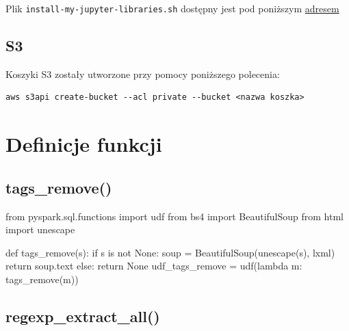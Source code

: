\documentclass[
  letterpaper,
  DIV=11,
  numbers=noendperiod]{scrreprt}
\newenvironment{Shaded}{\begin{snugshade}}{\end{snugshade}}
\newcommand{\ControlFlowTok}[1]{\textcolor[rgb]{0.00,0.23,0.31}{#1}}
\newcommand{\ImportTok}[1]{\textcolor[rgb]{0.00,0.46,0.62}{#1}}
\newcommand{\KeywordTok}[1]{\textcolor[rgb]{0.00,0.23,0.31}{#1}}
\newcommand{\NormalTok}[1]{\textcolor[rgb]{0.00,0.23,0.31}{#1}}
\newcommand{\OperatorTok}[1]{\textcolor[rgb]{0.37,0.37,0.37}{#1}}
\newcommand{\StringTok}[1]{\textcolor[rgb]{0.13,0.47,0.30}{#1}}
\newcommand{\VariableTok}[1]{\textcolor[rgb]{0.07,0.07,0.07}{#1}}
\begin{document}
\normalsize

Plik \texttt{install-my-jupyter-libraries.sh} dostępny jest pod
poniższym \href{}{adresem}

\hypertarget{s3}{%
\subsection{S3}\label{s3}}

Koszyki S3 zostały utworzone przy pomocy poniższego polecenia:

\begin{verbatim}
aws s3api create-bucket --acl private --bucket <nazwa koszka>
\end{verbatim}

\hypertarget{definicje-funkcji}{%
\section{Definicje funkcji}\label{definicje-funkcji}}

\hypertarget{sec-tags-remove}{%
\subsection{tags\_remove()}\label{sec-tags-remove}}

\begin{Shaded}
\begin{Highlighting}[]
\ImportTok{from}\NormalTok{ pyspark.sql.functions }\ImportTok{import}\NormalTok{ udf}
\ImportTok{from}\NormalTok{ bs4 }\ImportTok{import}\NormalTok{ BeautifulSoup}
\ImportTok{from}\NormalTok{ html }\ImportTok{import}\NormalTok{ unescape}

\KeywordTok{def}\NormalTok{ tags\_remove(s):}
    \ControlFlowTok{if}\NormalTok{ s }\KeywordTok{is} \KeywordTok{not} \VariableTok{None}\NormalTok{:}
\NormalTok{        soup }\OperatorTok{=}\NormalTok{ BeautifulSoup(unescape(s), }\StringTok{\textquotesingle{}lxml\textquotesingle{}}\NormalTok{)}
        \ControlFlowTok{return}\NormalTok{ soup.text}
    \ControlFlowTok{else}\NormalTok{: }
        \ControlFlowTok{return} \VariableTok{None}
\NormalTok{udf\_tags\_remove }\OperatorTok{=}\NormalTok{ udf(}\KeywordTok{lambda}\NormalTok{ m: tags\_remove(m))}
\end{Highlighting}
\end{Shaded}

\hypertarget{regexp_extract_all}{%
\subsection{regexp\_extract\_all()}\label{regexp_extract_all}}
\end{document}
